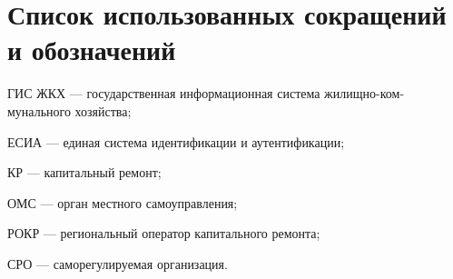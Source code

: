 \section*{Список использованных сокращений и обозначений}

ГИС ЖКХ --- государственная информационная система жилищно-ком-\linebreak мунального хозяйства;

ЕСИА --- единая система идентификации и аутентификации;

КР --- капитальный ремонт;

ОМС --- орган местного самоуправления;

РОКР --- региональный оператор капитального ремонта;

СРО --- саморегулируемая организация.

\clearpage
\newpage